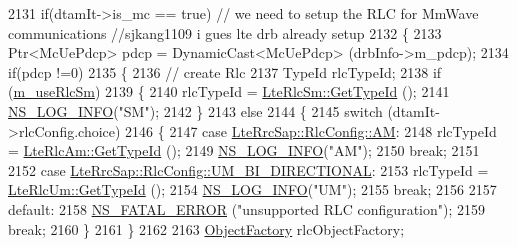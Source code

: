 \begin{DoxyCode}
2131           \textcolor{keywordflow}{if}(dtamIt->is\_mc == \textcolor{keyword}{true}) \textcolor{comment}{// we need to setup the RLC for MmWave communications  //sjkang1109 i
       gues lte drb already setup}
2132           \{
2133             Ptr<McUePdcp> pdcp = DynamicCast<McUePdcp> (drbInfo->m\_pdcp);
2134             \textcolor{keywordflow}{if}(pdcp !=0)
2135             \{
2136               \textcolor{comment}{// create Rlc}
2137               TypeId rlcTypeId;
2138               \textcolor{keywordflow}{if} (\hyperlink{classns3_1_1LteUeRrc_a724b0f4009ef95b569c52afb344fd5ae}{m\_useRlcSm})
2139                 \{
2140                   rlcTypeId = \hyperlink{classns3_1_1LteRlcSm_a160bd39ce4e0d113dd5d93cc3a258045}{LteRlcSm::GetTypeId} ();
2141                   \hyperlink{group__logging_gafbd73ee2cf9f26b319f49086d8e860fb}{NS\_LOG\_INFO}(\textcolor{stringliteral}{"SM"});
2142                 \}
2143               \textcolor{keywordflow}{else}
2144                 \{
2145                   \textcolor{keywordflow}{switch} (dtamIt->rlcConfig.choice)
2146                     \{
2147                     \textcolor{keywordflow}{case} \hyperlink{structns3_1_1LteRrcSap_1_1RlcConfig_ab6ab94ca4abaf717926f31db4dddc61baac722b7609a143367fc24a94f8e4f6c7}{LteRrcSap::RlcConfig::AM}: 
2148                       rlcTypeId = \hyperlink{classns3_1_1LteRlcAm_a28143176a465769583d9db0b4b36b91b}{LteRlcAm::GetTypeId} ();
2149                       \hyperlink{group__logging_gafbd73ee2cf9f26b319f49086d8e860fb}{NS\_LOG\_INFO}(\textcolor{stringliteral}{"AM"});
2150                       \textcolor{keywordflow}{break};
2151               
2152                     \textcolor{keywordflow}{case} \hyperlink{structns3_1_1LteRrcSap_1_1RlcConfig_ab6ab94ca4abaf717926f31db4dddc61ba55368feac1627138969235809e6eedc5}{LteRrcSap::RlcConfig::UM\_BI\_DIRECTIONAL}: 
2153                       rlcTypeId = \hyperlink{classns3_1_1LteRlcUm_a119b2b1273c42483a050896d5232829d}{LteRlcUm::GetTypeId} ();
2154                       \hyperlink{group__logging_gafbd73ee2cf9f26b319f49086d8e860fb}{NS\_LOG\_INFO}(\textcolor{stringliteral}{"UM"});
2155                       \textcolor{keywordflow}{break};
2156               
2157                     \textcolor{keywordflow}{default}:
2158                       \hyperlink{group__fatal_ga5131d5e3f75d7d4cbfd706ac456fdc85}{NS\_FATAL\_ERROR} (\textcolor{stringliteral}{"unsupported RLC configuration"});
2159                       \textcolor{keywordflow}{break};                
2160                     \}
2161                 \}
2162       
2163               \hyperlink{classns3_1_1Object_a2810e70b8c8377aa8617138fc0f65e92}{ObjectFactory} rlcObjectFactory;

\end{DoxyCode}
